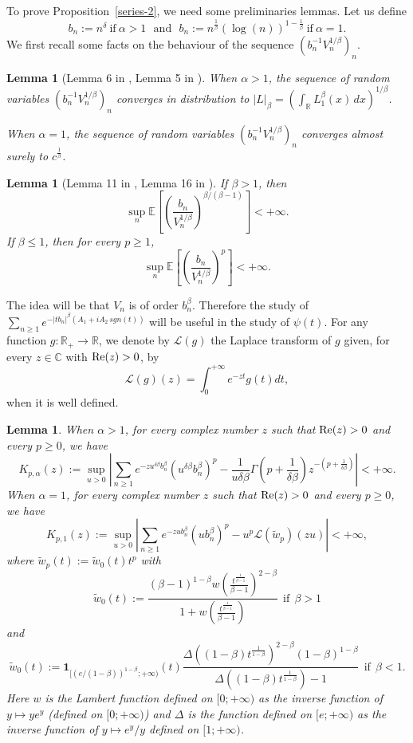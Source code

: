 \documentclass[oneside, a4paper,11pt,reqno]{amsart}
\newtheorem{lem}[hypo]{Lemma}
\begin{document}
\noindent To prove Proposition~\ref{series-2}, we need some preliminaries lemmas. Let us define
\begin{equation}\label{bn}
b_n:=n^{\delta}\ \mbox{if}\ \alpha>1\ \ \ \mbox{and}\ \ \ 
 b_n:= n^{\frac 1\beta}(\log(n))^{1-\frac 1\beta}\ \mbox{if}\ \alpha=1.
\end{equation}
We first recall some facts on the behaviour of the sequence 
$\left(b_n^{-1}V_n^{1/\beta}\right)_n$. 
\begin{lem} [Lemma 6 in \cite{KestenSpitzer}, Lemma 5 in \cite{FFN}]\label{Vn}
When $\alpha>1$, the sequence of random variables $\left(b_n^{-1}V_n^{1/\beta}
\right)_n$
converges in distribution to $|L|_\beta=\left( \int_{\mathbb R} L_1^\beta(x)\,
dx\right)^{1/\beta} $. 

When $\alpha=1$, the sequence of random variables $\left(b_n^{-1} V_n^{1/\beta}
\right)_n$
converges almost surely to $c^{\frac 1\beta}$. 
\end{lem}
\begin{lem}[Lemma 11 in \cite{BFFN}, Lemma 16 in \cite{FFN}]\label{Vn2}
If $\beta >1$, then 
$$\sup_n \mathbb{E}\left[ \left( \frac{b_n} {V_n^{1/\beta}}\right)^{\beta/(\beta-1)} \right] <+\infty.$$
If $\beta\le 1$, then  for every $p\geq 1$, 
$$\sup_n \mathbb{E}\left[ \left( \frac{b_n} {V_n^{1/\beta}}\right)^{p} \right] <+\infty.$$
\end{lem}
\noindent The idea will be that $V_n$ is of order $b_n^{\beta}$.
Therefore the study of $\sum_{n\ge 1}e^{-|tb_n|^\beta(A_1+iA_2\, sgn(t)) }$
will be useful in the study of $\psi(t)$. 
For any function $g: {\mathbb{R}}_+\rightarrow {\mathbb{R}}$,  we denote by ${\mathcal L}(g)$ the Laplace transform of 
$g$ given, for every $z\in{\mathbb{C}}$ with $\mbox{\rm Re}(z)>0$, by
$${\mathcal L}(g) (z) =\int_{0}^{+\infty} e^{-z t} g(t) dt,$$
when it is well defined.
\begin{lem}\label{kaa}
When $\alpha>1$,  for every complex number $z$ such that
$\text{\rm Re}(z)>0$ and every $p\ge 0$, we have
$$ K_{p,\alpha}(z):= \sup_{u>0}\left\vert \sum_{n\ge 1} e^{- zu^{\delta\beta}b_n^\beta}
(u^{\delta\beta}b_n^\beta)^{p}  -  \frac{1}{u\delta \beta} \Gamma(p+\frac{1}{\delta\beta}) z^{-(p+\frac{1}{\delta\beta})} \right\vert <+\infty.$$
When  $\alpha=1$, for every complex number $z$ such that
$\text{\rm Re}(z)>0$ and every $p\ge 0$, we have
$$ K_{p,1}(z):= \sup_{u>0}\left\vert \sum_{n\ge 1} e^{- z u b_n^\beta}
(u b_n^\beta)^{p}  -  u^p \mathcal{L}(\tilde{w}_p) (zu) \right\vert <+\infty,$$
where $\tilde w_p(t):=\tilde w_0(t) t^p$
with
$$\tilde w_0(t) :=\frac{(\beta-1)^{1-\beta} w\left(\frac{t^{\frac 1{\beta-1}}}
  {\beta-1}\right)^{2-\beta}}{1+w\left(\frac{t^{\frac 1{\beta-1}}}
  {\beta-1}\right)} \ \ \mbox{if}\ \ \beta>1$$
and 
$$\tilde w_0(t):={\mathbf 1}_{[(e/(1-\beta))^{1-\beta};+\infty)}(t)
   \frac{\Delta((1-\beta)t^{\frac 1{1-\beta}})
    ^{2-\beta}(1-\beta)^{1-\beta}}
  {\Delta((1-\beta)t^{\frac 1{1-\beta}})-1}\ \ \mbox{if}\ \ \beta<1.$$ 
Here $w$ is the Lambert function defined on $[0;+\infty)$ as the
inverse function of $y\mapsto y e^y$ (defined on $[0;+\infty)$)
and $\Delta$ is the function defined on $[e;+\infty)$ as the inverse function 
of $y\mapsto e^y/y$ defined
on $[1;+\infty)$.
\end{lem}
\end{document}
